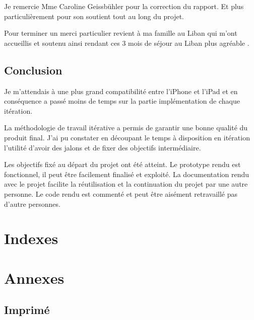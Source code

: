 \documentclass[12pt,a4paper,twoside]{report}
\begin{document}
Je remercie Mme Caroline Geissbühler pour la correction du rapport. Et plus particulièrement pour son soutient tout au long du projet. 

Pour terminer un merci particulier revient à ma famille au Liban qui m'ont accueillis et soutenu ainsi rendant ces 3 mois de séjour au Liban plus agréable .

\section{Conclusion}
Je m'attendais à une plus grand compatibilité entre l'iPhone et l'iPad et en conséquence a passé moins de temps sur la partie implémentation de chaque itération.

La méthodologie de travail itérative a permis de garantir une bonne  qualité du produit final. J'ai pu constater en découpant le temps à disposition en itération l'utilité d'avoir des jalons et de fixer des objectifs intermédiaire. 

Les objectifs fixé au départ du projet ont été atteint. Le prototype rendu est fonctionnel, il peut être facilement finalisé et exploité.  La documentation rendu avec le projet facilite la réutilisation et la continuation du projet  par une autre personne. Le code rendu est commenté et peut être aisément retravaillé pas d'autre personnes.

\cleardoublepage


\chapter{Indexes}
\cleardoublepage

\renewcommand{\bibname}{Références}

\begin{flushleft}

\end{flushleft}




\printglossaries

\listoffigures

\lstlistoflistings

\cleardoublepage
\chapter{Annexes}
\section{Imprimé}
\end{document}
